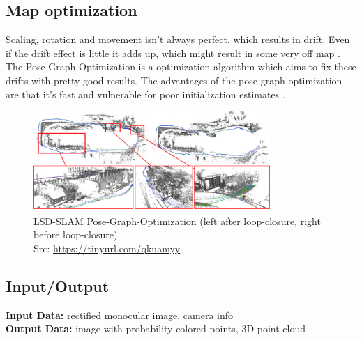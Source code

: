 \subsection{Map optimization}
Scaling, rotation and movement isn't always perfect, which results in drift. Even if the drift effect is little it adds up, which might result in some very off map \cite{lsdslam_eccv}. The Pose-Graph-Optimization is a optimization algorithm which aims to fix these drifts with pretty good results. The advantages of the pose-graph-optimization are that it's fast and vulnerable for poor initialization estimates \cite{posegraphoptimization}. \newline

\begin{figure}[h]
	\centering
	\includegraphics[width=0.8\textwidth]{./media/images/lsd-slam-pose-graph-optimization.jpg}
  	\caption{LSD-SLAM Pose-Graph-Optimization (left after loop-closure, right before loop-closure)
  	\\Src: \url{https://tinyurl.com/qkuamyy}}
  	\label{lsd-pose-graph-optimization}
\end{figure}

\subsection{Input/Output}
\textbf{Input Data:} rectified monocular image, camera info\\
\textbf{Output Data:} image with probability colored points, 3D point cloud